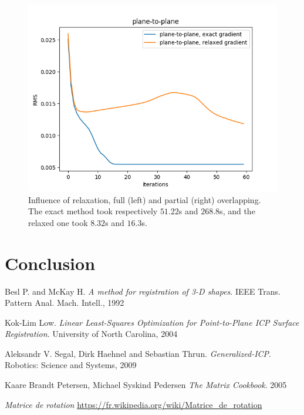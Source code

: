 \documentclass[11pt,letterpaper,leqno]{article}
\begin{document}
\begin{itemize}
\begin{figure}[ht!]
\begin{minipage}{0.5\linewidth}
        \end{minipage}\hfill
        \begin{minipage}{0.5\linewidth}
        \includegraphics[width=\linewidth]{img/comparison_relaxed.png}
        \end{minipage}
        \caption{Influence of relaxation, full (left) and partial (right) overlapping. The exact method took respectively $51.22$s and $268.8$s, and the relaxed one took $8.32$s and $16.3$s.}
        \label{fig:relaxation}
    \end{figure}
\end{itemize}

\section{Conclusion}

\break

\begin{thebibliography}{9}

    Besl P. and McKay H.
    \textit{A method for registration of 3-D shapes}. 
    IEEE Trans. Pattern Anal. Mach. Intell., 1992

    Kok-Lim Low.
    \textit{Linear Least-Squares Optimization for
    Point-to-Plane ICP Surface Registration}. 
    University of North Carolina, 2004

    Aleksandr V. Segal, Dirk Haehnel and Sebastian Thrun.
    \textit{Generalized-ICP}. 
    Robotics: Science and Systems, 2009

    Kaare Brandt Petersen, Michael Syskind Pedersen
    \textit{The Matrix Cookbook}. 2005

    \textit{Matrice de rotation} \url{https://fr.wikipedia.org/wiki/Matrice_de_rotation}

\end{thebibliography}
\end{document}
